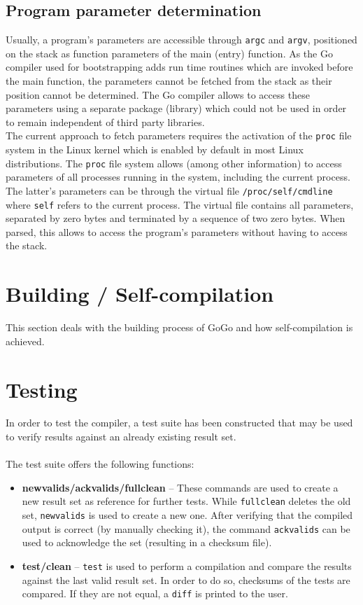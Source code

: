 \documentclass[a4paper]{scrreprt}
\begin{document}
    \section{Program parameter determination}
      Usually, a program's parameters are accessible through \texttt{argc} and \texttt{argv}, positioned on the stack as function parameters of the main (entry) function. As the Go compiler used for bootstrapping adds run time routines which are invoked before the main function, the parameters cannot be fetched from the stack as their position cannot be determined. The Go compiler allows to access these parameters using a separate package (library) which could not be used in order to remain independent of third party libraries.\\
      The current approach to fetch parameters requires the activation of the \texttt{proc} file system in the Linux kernel which is enabled by default in most Linux distributions\cite{var06}. The \texttt{proc} file system allows (among other information) to access parameters of all processes running in the system, including the current process. The latter's parameters can be through the virtual file \texttt{/proc/self/cmdline} where \texttt{self} refers to the current process. The virtual file contains all parameters, separated by zero bytes and terminated by a sequence of two zero bytes. When parsed, this allows to access the program's parameters without having to access the stack.
	
  \chapter{Building / Self-compilation}
    This section deals with the building process of GoGo and how self-compilation is achieved.

  \chapter{Testing}
    In order to test the compiler, a test suite has been constructed that may be used to verify results against an already existing result set. \\ \\
    The test suite offers the following functions:
    \begin{itemize}
      \item \textbf{newvalids/ackvalids/fullclean} -- These commands are used to create a new result set as reference for further tests. While \texttt{fullclean} deletes the old set, \texttt{newvalids} is used to create a new one. After verifying that the compiled output is correct (by manually checking it), the command \texttt{ackvalids} can be used to acknowledge the set (resulting in a checksum file). 
      \item \textbf{test/clean} -- \texttt{test} is used to perform a compilation and compare the results against the last valid result set. In order to do so, checksums of the tests are compared. If they are not equal, a \texttt{diff} is printed to the user.
    \end{itemize}

  
  
\end{document}
